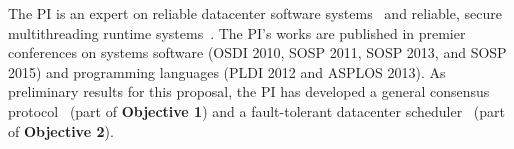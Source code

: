 The PI is an expert on reliable datacenter software systems~\cite{crane:sosp15, 
tripod:apsys16} and reliable, secure multithreading runtime 
systems~\cite{smt:cacm, cui:tern:osdi10, peregrine:sosp11, parrot:sosp13}. The 
PI's works are published in premier conferences on systems software (OSDI 2010, 
SOSP 2011, SOSP 2013, and SOSP 2015) and programming languages (PLDI 2012 and 
ASPLOS 2013). As preliminary results for this \xxx proposal, the PI has 
developed a general consensus protocol~\cite{crane:sosp15} (part of 
\textbf{Objective 1}) and a fault-tolerant datacenter 
scheduler~\cite{tripod:apsys16} (part of \textbf{Objective 2}).




